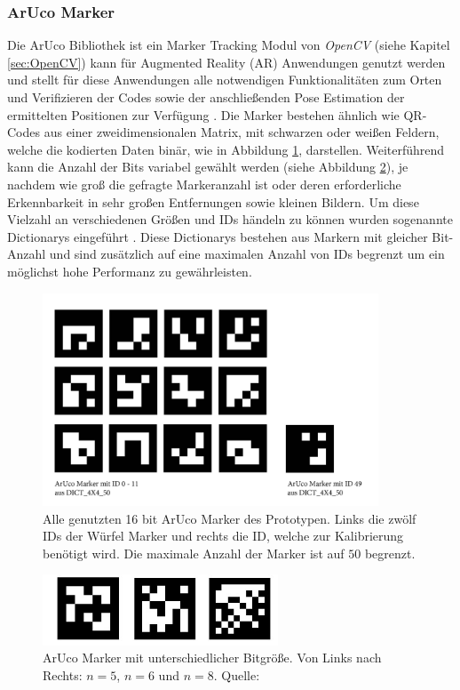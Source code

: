 \subsubsection{ArUco Marker} \label{sec:aruco} 
Die ArUco Bibliothek ist ein Marker Tracking Modul von \textit{OpenCV} (siehe Kapitel \ref{sec:OpenCV}) kann für Augmented Reality (AR) Anwendungen genutzt werden und stellt für diese Anwendungen alle notwendigen Funktionalitäten zum Orten und Verifizieren der Codes sowie der anschließenden Pose Estimation der ermittelten Positionen zur Verfügung \cite{article:Aruco2014}. 
Die Marker bestehen ähnlich wie QR-Codes aus einer zweidimensionalen Matrix, mit schwarzen oder weißen Feldern, welche die kodierten Daten binär, wie in Abbildung \ref{fig:AllUsedArucoMarker}, darstellen.  Weiterführend kann die Anzahl der Bits variabel gewählt werden (siehe Abbildung \ref{fig:SizesArucoMarker}), je nachdem wie groß die gefragte Markeranzahl ist oder deren erforderliche Erkennbarkeit in sehr großen Entfernungen sowie kleinen Bildern. Um diese Vielzahl an verschiedenen Größen und IDs händeln zu können wurden sogenannte Dictionarys eingeführt \cite{article:ArucoDictGarridoJurado2015}. Diese Dictionarys bestehen aus Markern mit gleicher Bit-Anzahl und sind zusätzlich auf eine maximalen Anzahl von IDs begrenzt um ein möglichst hohe Performanz zu gewährleisten.\\


\begin{figure}[H] 
	\center 
	\includegraphics[width=10cm]{Bilder/Aruco_marker.jpg}			
	\caption{Alle genutzten 16 bit ArUco Marker des Prototypen. Links die zwölf IDs der Würfel Marker und rechts die ID, welche zur Kalibrierung benötigt wird. Die maximale Anzahl der Marker ist auf $50$ begrenzt.}
	\label{fig:AllUsedArucoMarker}
\end{figure}

\begin{figure}[H] 
	\center 
	\includegraphics[width=7cm]{Bilder/VerschAruco.jpg}			
	\caption{ArUco Marker mit unterschiedlicher Bitgröße. Von Links nach Rechts: $n=5$, $n=6$ und $n=8$. Quelle: \cite{article:Aruco2014}}
	\label{fig:SizesArucoMarker}
\end{figure}

